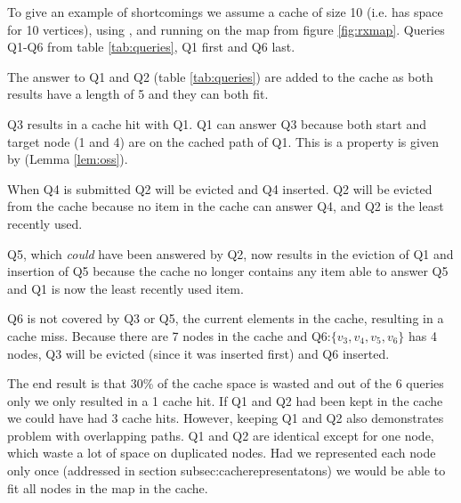 


To give an example of \lrus shortcomings we assume a cache of size 10 (i.e. has space for 10 vertices), using \lruns, and running on the map from figure \ref{fig:rxmap}. Queries Q1-Q6 from table \ref{tab:queries}, Q1 first and Q6 last.

The answer to Q1 and Q2 (table \ref{tab:queries}) are added to the cache as both results have a length of 5 and they can both fit. 

Q3 results in a cache hit with Q1. Q1 can answer Q3 because both start and target node (1 and 4) are on the cached path of Q1. This is a property is given by \oss (Lemma \ref{lem:oss}).

When Q4 is submitted Q2 will be evicted and Q4 inserted. Q2 will be evicted from the cache because no item in the cache can answer Q4, and Q2 is the least recently used.

Q5, which \textit{could} have been answered by Q2, now results in the eviction of Q1 and insertion of Q5 because the cache no longer contains any item able to answer Q5 and Q1 is now the least recently used item.

Q6 is not covered by Q3 or Q5, the current elements in the cache, resulting in a cache miss. Because there are 7 nodes in the cache and Q6:$\{v_3,v_4,v_5,v_6\}$ has 4 nodes, Q3 will be evicted (since it was inserted first) and Q6 inserted. 

The end result is that 30\% of the cache space is wasted and out of the 6 queries only we only resulted in a 1 cache hit. If Q1 and Q2 had been kept in the cache we could have had 3 cache hits. However, keeping Q1 and Q2 also  demonstrates \lrus problem with overlapping paths. Q1 and Q2 are identical except for one node, which waste a lot of space on duplicated nodes. Had we represented each node only once (addressed in section {subsec:cacherepresentatons}) we would be able to fit all nodes in the map in the cache.






